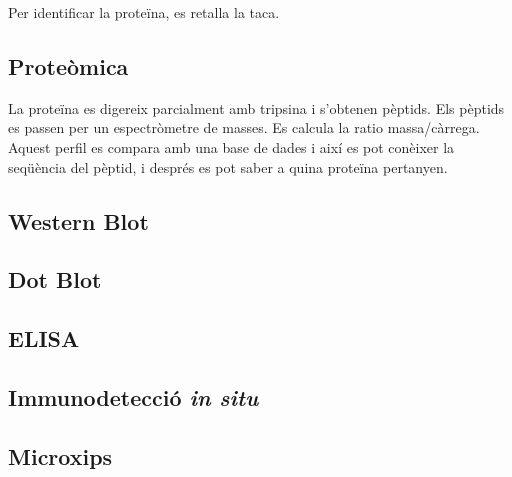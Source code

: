 Per identificar la proteïna, es retalla la taca.

\subsection{Proteòmica}
\label{sec:proteomica}
La proteïna es digereix parcialment amb tripsina i s'obtenen pèptids. Els pèptids es passen per un espectròmetre de masses. Es calcula la ratio massa/càrrega. Aquest perfil es compara amb una base de dades i així es pot conèixer la seqüència del pèptid, i després es pot saber a quina proteïna pertanyen.

\subsection{Western Blot}
\label{sec:western-blot}


\subsection{Dot Blot}
\label{sec:dot-blot}


\subsection{ELISA}
\label{sec:elisa}


\subsection{Immunodetecció \textit{in situ}}
\label{sec:immunodeteccio-situ}


\subsection{Microxips}
\label{sec:microxips}

